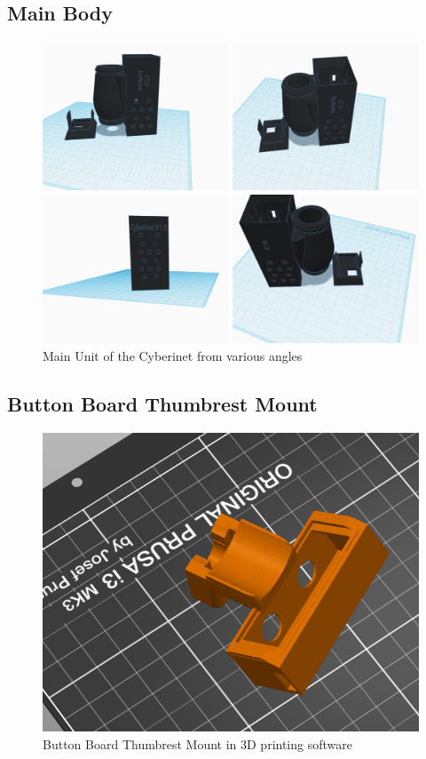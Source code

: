 \subsection{Main Body}

\begin{figure}
    \centering
    \includegraphics[scale=0.4]{diagrams/3D Models/Cyberinet main case 3d.png}
    \caption{Main Unit of the Cyberinet from various angles}
    \label{fig:main3D}
\end{figure}



\subsection{Button Board Thumbrest Mount}

\begin{figure}
    \centering
    \includegraphics[scale=0.8]{diagrams/3D Models/thumbrestPic.png}
    \caption{Button Board Thumbrest Mount in 3D printing software}
    \label{fig:thumbrest}
\end{figure}



